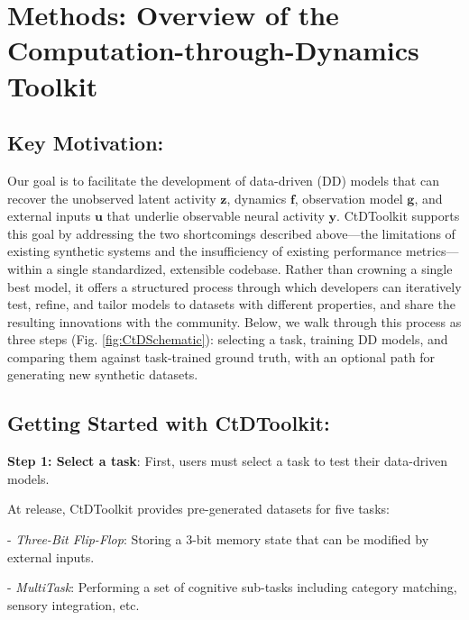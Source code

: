 \documentclass{article}
\begin{document}
\vspace{-0.2cm}
\section{Methods: Overview of the Computation-through-Dynamics Toolkit \label{sec: methods}}
\vspace{-0.4cm}
\subsection{Key Motivation:}
\vspace{-0.2cm}

Our goal is to facilitate the development of data-driven (DD) models that can recover the unobserved latent activity $\mathbf{z}$, dynamics $\mathbf{f}$, observation model $\mathbf{g}$, and external inputs $\mathbf{u}$ that underlie observable neural activity $\mathbf{y}$. CtDToolkit supports this goal by addressing the two shortcomings described above—the limitations of existing synthetic systems and the insufficiency of existing performance metrics—within a single standardized, extensible codebase. Rather than crowning a single best model, it offers a structured process through which developers can iteratively test, refine, and tailor models to datasets with different properties, and share the resulting innovations with the community. Below, we walk through this process as three steps (Fig. \ref{fig:CtDSchematic}): selecting a task, training DD models, and comparing them against task-trained ground truth, with an optional path for generating new synthetic datasets.

\vspace{-0.2cm}
\subsection{Getting Started with CtDToolkit:}
\vspace{-0.2cm}

\textbf{Step 1: Select a task}: First, users must select a task to test their data-driven models.

At release, CtDToolkit provides pre-generated datasets for five tasks:

\hspace*{2em}- \textit{Three-Bit Flip-Flop}: Storing a 3-bit memory state that can be modified by external inputs.

\hspace*{2em}- \textit{MultiTask}: Performing a set of cognitive sub-tasks including category matching, sensory integration, etc.
\end{document}
